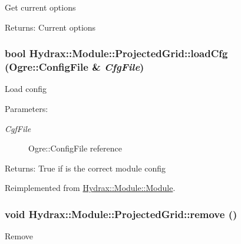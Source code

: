 Get current options \begin{Desc}
\item[Returns:]Current options \end{Desc}
\hypertarget{class_hydrax_1_1_module_1_1_projected_grid_f951c58cc93cf75d57e69aa14a668d3e}{
\subsubsection[{loadCfg}]{\setlength{\rightskip}{0pt plus 5cm}bool Hydrax::Module::ProjectedGrid::loadCfg (Ogre::ConfigFile \& {\em CfgFile})}}
\label{class_hydrax_1_1_module_1_1_projected_grid_f951c58cc93cf75d57e69aa14a668d3e}


Load config \begin{Desc}
\item[Parameters:]
\begin{description}
\item[{\em CgfFile}]Ogre::ConfigFile reference \end{description}
\end{Desc}
\begin{Desc}
\item[Returns:]True if is the correct module config \end{Desc}


Reimplemented from \hyperlink{class_hydrax_1_1_module_1_1_module_bedb96357608c0744bb7816ae1c2b0bb}{Hydrax::Module::Module}.\hypertarget{class_hydrax_1_1_module_1_1_projected_grid_b878b7d1258aacda8bee0f2e945ea64d}{
\subsubsection[{remove}]{\setlength{\rightskip}{0pt plus 5cm}void Hydrax::Module::ProjectedGrid::remove ()}}
\label{class_hydrax_1_1_module_1_1_projected_grid_b878b7d1258aacda8bee0f2e945ea64d}


Remove 

